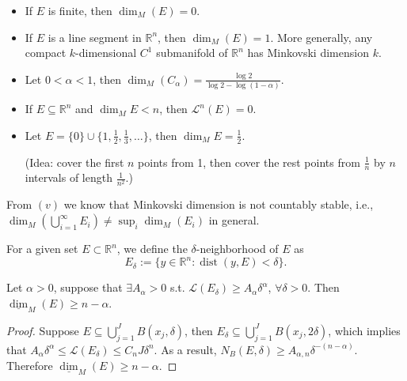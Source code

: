     \begin{example}
        \begin{itemize}
            \item[(i)] If $E$ is finite, then $\operatorname{dim}_{M}(E)=0$.
            \item[(ii)] If $E$ is a line segment in $\mathbb{R}^{n}$, then $\operatorname{dim}_{M}(E)=1$. 
            More generally, any compact $k$-dimensional $C^{1}$ submanifold of $\mathbb{R}^{n}$ has Minkovski dimension $k$.
            \item[(iii)] Let $0<\alpha<1$, then $\operatorname{dim}_{M}(C_{\alpha})=\frac{\log 2}{\log 2 - \log (1-\alpha)}$.
            \item[(iv)] If $E \subseteq \mathbb{R}^{n}$ and $\operatorname{dim}_{M}E<n$, then $\mathcal{L}^{n}(E)=0$.
            \item[(v)] Let $E = \{ 0 \}\cup \{ 1,\frac{1}{2},\frac{1}{3}, \ldots  \}$, then $\operatorname{dim}_{M}E=\frac{1}{2}$.
            
            (Idea: cover the first $n$ points from 1, then cover the rest points from $\frac{1}{n}$ by $n$ intervals of length $\frac{1}{n^{2}}$.)
        \end{itemize}
    \end{example}

    \begin{remark}
        From $(v)$ we know that Minkovski dimension is not countably stable, i.e., $\operatorname{dim}_{M}(\bigcup_{i=1}^{\infty} E_{i}) \neq \sup_{i} \operatorname{dim}_{M}(E_{i})$ in general.
    \end{remark}

    For a given set $E \subset \mathbb{R}^{n}$, we define the $\delta$-neighborhood of $E$ as
    $$
    E_{\delta} := \{ y\in \mathbb{R}^{n}: \operatorname{dist}(y,E)<\delta \}.
    $$

    \begin{lemma}
        Let $\alpha>0$, suppose that $\exists A_{\alpha}>0$ s.t. $\mathcal{L}(E_{\delta})\ge A_{\alpha}\delta^{\alpha}$, $\forall \delta>0$. Then $\underline{\operatorname{dim}}_{M}(E) \geq n-\alpha$.
    \end{lemma}

    \begin{proof}
        Suppose $E \subseteq \bigcup_{j=1}^{J} B(x_{j},\delta)$, then $E_{\delta} \subseteq \bigcup_{j=1}^{J} B(x_{j},2\delta)$, which implies that $A_{\alpha}\delta^{\alpha}\le \mathcal{L}(E_{\delta})\le C_{n}J\delta^{n}$. As a result, $N_{B}(E,\delta)\ge A_{\alpha,n}\delta^{-(n-\alpha)}$. Therefore $\underline{\operatorname{dim}}_{M}(E)\ge n-\alpha$.
    \end{proof}


